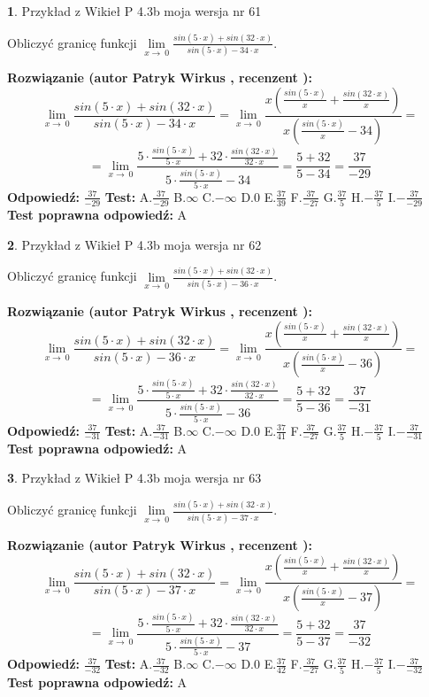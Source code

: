 \documentclass[12pt, a4paper]{article}
\theoremstyle{definition} %
\newtheorem{zad}{}
\newcommand{\zadStart}[1]{\begin{zad}#1\newline}
\newcommand{\zadStop}{\end{zad}}
\newcommand{\rozwStart}[2]{\noindent \textbf{Rozwiązanie (autor #1 , recenzent #2): }\newline}
\newcommand{\rozwStop}{\newline}
\newcommand{\odpStart}{\noindent \textbf{Odpowiedź:}\newline}
\newcommand{\odpStop}{\newline}
\newcommand{\testStart}{\noindent \textbf{Test:}\newline}
\newcommand{\testStop}{\newline}
\newcommand{\kluczStart}{\noindent \textbf{Test poprawna odpowiedź:}\newline}
\newcommand{\kluczStop}{\newline}
\begin{document}
\zadStart{Przykład z Wikieł P 4.3b moja wersja nr 61}


Obliczyć granicę funkcji $\lim\limits_{x\to\ 0}\frac{sin(5 \cdot x)+sin(32 \cdot x)}{sin(5 \cdot x)-34 \cdot x}$.
\zadStop
\rozwStart{Patryk Wirkus}{}
$$\lim\limits_{x\to\ 0}\frac{sin(5 \cdot x)+sin(32 \cdot x)}{sin(5 \cdot x)-34 \cdot x}=\lim\limits_{x\to\ 0}\frac{x(\frac{sin(5 \cdot x)}{x}+\frac{sin(32 \cdot x)}{x})}{x(\frac{sin(5 \cdot x)}{x}-34)}=$$
$$=\lim\limits_{x\to\ 0}\frac{5 \cdot \frac{sin(5 \cdot x)}{5 \cdot x}+32 \cdot \frac{sin(32 \cdot x)}{32 \cdot x}}{5 \cdot \frac{sin(5 \cdot x)}{5 \cdot x}-34}=\frac{5+32}{5-34} = \frac{37}{-29}$$
\rozwStop
\odpStart
$\frac{37}{-29}$
\odpStop
\testStart
A.$\frac{37}{-29}$
B.$\infty$
C.$-\infty$
D.$0$
E.$\frac{37}{39}$
F.$\frac{37}{-27}$
G.$\frac{37}{5}$
H.$-\frac{37}{5}$
I.$-\frac{37}{-29}$
\testStop
\kluczStart
A
\kluczStop



\zadStart{Przykład z Wikieł P 4.3b moja wersja nr 62}


Obliczyć granicę funkcji $\lim\limits_{x\to\ 0}\frac{sin(5 \cdot x)+sin(32 \cdot x)}{sin(5 \cdot x)-36 \cdot x}$.
\zadStop
\rozwStart{Patryk Wirkus}{}
$$\lim\limits_{x\to\ 0}\frac{sin(5 \cdot x)+sin(32 \cdot x)}{sin(5 \cdot x)-36 \cdot x}=\lim\limits_{x\to\ 0}\frac{x(\frac{sin(5 \cdot x)}{x}+\frac{sin(32 \cdot x)}{x})}{x(\frac{sin(5 \cdot x)}{x}-36)}=$$
$$=\lim\limits_{x\to\ 0}\frac{5 \cdot \frac{sin(5 \cdot x)}{5 \cdot x}+32 \cdot \frac{sin(32 \cdot x)}{32 \cdot x}}{5 \cdot \frac{sin(5 \cdot x)}{5 \cdot x}-36}=\frac{5+32}{5-36} = \frac{37}{-31}$$
\rozwStop
\odpStart
$\frac{37}{-31}$
\odpStop
\testStart
A.$\frac{37}{-31}$
B.$\infty$
C.$-\infty$
D.$0$
E.$\frac{37}{41}$
F.$\frac{37}{-27}$
G.$\frac{37}{5}$
H.$-\frac{37}{5}$
I.$-\frac{37}{-31}$
\testStop
\kluczStart
A
\kluczStop



\zadStart{Przykład z Wikieł P 4.3b moja wersja nr 63}


Obliczyć granicę funkcji $\lim\limits_{x\to\ 0}\frac{sin(5 \cdot x)+sin(32 \cdot x)}{sin(5 \cdot x)-37 \cdot x}$.
\zadStop
\rozwStart{Patryk Wirkus}{}
$$\lim\limits_{x\to\ 0}\frac{sin(5 \cdot x)+sin(32 \cdot x)}{sin(5 \cdot x)-37 \cdot x}=\lim\limits_{x\to\ 0}\frac{x(\frac{sin(5 \cdot x)}{x}+\frac{sin(32 \cdot x)}{x})}{x(\frac{sin(5 \cdot x)}{x}-37)}=$$
$$=\lim\limits_{x\to\ 0}\frac{5 \cdot \frac{sin(5 \cdot x)}{5 \cdot x}+32 \cdot \frac{sin(32 \cdot x)}{32 \cdot x}}{5 \cdot \frac{sin(5 \cdot x)}{5 \cdot x}-37}=\frac{5+32}{5-37} = \frac{37}{-32}$$
\rozwStop
\odpStart
$\frac{37}{-32}$
\odpStop
\testStart
A.$\frac{37}{-32}$
B.$\infty$
C.$-\infty$
D.$0$
E.$\frac{37}{42}$
F.$\frac{37}{-27}$
G.$\frac{37}{5}$
H.$-\frac{37}{5}$
I.$-\frac{37}{-32}$
\testStop
\kluczStart
A
\kluczStop
\end{document}
